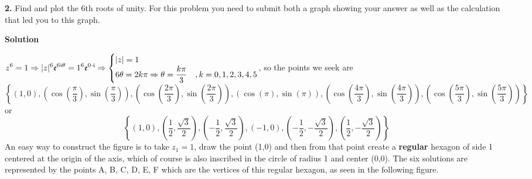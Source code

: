 \documentclass[11pt]{amsart}
\newcommand{\dsp}{\displaystyle}
\begin{document}
\textbf{2.} Find and plot the 6th roots of unity. For this problem you need to submit both 
a graph showing your answer as well as the calculation that led you to this graph. 
\begin{center}
\textbf{Solution}
\end{center}
$\dsp z^6=1\Rightarrow |z|^{6}\mathfrak{e}^{6\mi\theta}=1^{6}\mathfrak{e}^{0\cdot\mi}\Rightarrow 
\begin{cases}\dsp |z|=1&\\\dsp 6\theta=2k\pi\Rightarrow 
\theta=\frac{k\pi}{3}&,k=0,1,2,3,4,5\end{cases}$, so the points we seek are
\[
\left\{(1,0),\left(\cos\left(\frac{\pi}{3}\right),\sin\left(\frac{\pi}{3}\right)\right),
\left(\cos\left(\frac{2\pi}{3}\right),\sin\left(\frac{2\pi}{3}\right)\right),
\left(\cos\left(\pi\right) 
,\sin\left(\pi\right)\right),\left(\cos\left(\frac{4\pi}{3}\right),
\sin\left(\frac{4\pi}{3}\right)\right),\left(\cos\left(\frac{5\pi}{3}\right),
\sin\left(\frac{5\pi}{3}
 \right)\right)\right\}
\]
or 
\[
 \left\{(1,0),\left(\frac{1}{2},\frac{\sqrt{3}}{2}\right),\left(-\frac{1}{2},\frac{\sqrt{3}}{2}\right),(-1,0),
 \left(-\frac{1}{2},-\frac{\sqrt{3}}{2}\right),\left(\frac{1}{2},-\frac{\sqrt{3}}{2}\right)\right\}
\]
An easy way to construct the figure is to take $z_1=1$, draw the point (1,0) and then from that point create a 
\textbf{regular} hexagon of side 1 centered at the origin of the axis, which of course is 
also inscribed in the circle of radius 1 and center (0,0). The six solutions are 
represented by the  points A, B, C, D, E, F which are 
the vertices of this regular hexagon, as seen in the following figure.
\end{document}
